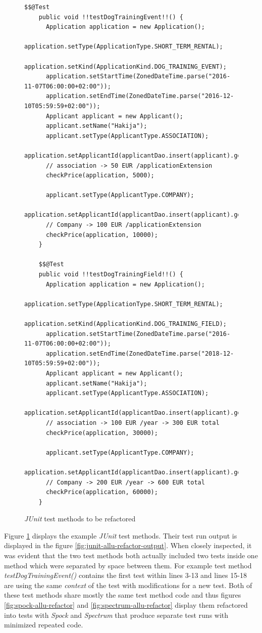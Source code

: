     \begin{figure}[H]
      \begin{lstlisting}[style=java]
    $$@Test
    public void !!testDogTrainingEvent!!() {
      Application application = new Application();
      application.setType(ApplicationType.SHORT_TERM_RENTAL);
      application.setKind(ApplicationKind.DOG_TRAINING_EVENT);
      application.setStartTime(ZonedDateTime.parse("2016-11-07T06:00:00+02:00"));
      application.setEndTime(ZonedDateTime.parse("2016-12-10T05:59:59+02:00"));
      Applicant applicant = new Applicant();
      applicant.setName("Hakija");
      applicant.setType(ApplicantType.ASSOCIATION);
      application.setApplicantId(applicantDao.insert(applicant).getId());
      // association -> 50 EUR /applicationExtension
      checkPrice(application, 5000);

      applicant.setType(ApplicantType.COMPANY);
      application.setApplicantId(applicantDao.insert(applicant).getId());
      // Company -> 100 EUR /applicationExtension
      checkPrice(application, 10000);
    }

    $$@Test
    public void !!testDogTrainingField!!() {
      Application application = new Application();
      application.setType(ApplicationType.SHORT_TERM_RENTAL);
      application.setKind(ApplicationKind.DOG_TRAINING_FIELD);
      application.setStartTime(ZonedDateTime.parse("2016-11-07T06:00:00+02:00"));
      application.setEndTime(ZonedDateTime.parse("2018-12-10T05:59:59+02:00"));
      Applicant applicant = new Applicant();
      applicant.setName("Hakija");
      applicant.setType(ApplicantType.ASSOCIATION);
      application.setApplicantId(applicantDao.insert(applicant).getId());
      // association -> 100 EUR /year -> 300 EUR total
      checkPrice(application, 30000);

      applicant.setType(ApplicantType.COMPANY);
      application.setApplicantId(applicantDao.insert(applicant).getId());
      // Company -> 200 EUR /year -> 600 EUR total
      checkPrice(application, 60000);
    }
        \end{lstlisting}
        \caption{\textit{JUnit} test methods to be refactored}
        \label{fig:junit-allu-refactor}

    \end{figure}

    Figure \ref{fig:junit-allu-refactor} displays the example \textit{JUnit} test methods. Their test run output is displayed in the
    figure \ref{fig:junit-allu-refactor-output}. When closely inspected, it was evident
    that the two test methods both actually included two tests inside one method which were separated by space between
    them. For example test method \textit{testDogTrainingEvent()} contains the first test within lines 3-13 and lines 15-18 are using
    the same \textit{context} of the test with modifications for a new test.
    Both of these test methods share mostly the same test method code and thus figures \ref{fig:spock-allu-refactor} and
    \ref{fig:spectrum-allu-refactor} display them refactored
    into tests with \textit{Spock} and \textit{Spectrum} that produce separate test runs with minimized repeated code.

